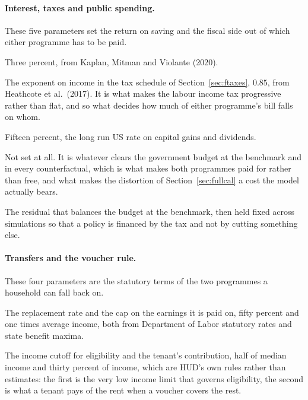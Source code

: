 \documentclass[10pt]{article}
\begin{document}
\paragraph{Interest, taxes and public spending.} These five parameters set the return on saving and the fiscal side out of which either programme has to be paid.
\begin{description}\setlength{\itemsep}{0.25em}\setlength{\parskip}{0em}
\item[$r$, the risk free rate.] Three percent, from Kaplan, Mitman and Violante
(2020).

\item[$\xi$, tax progressivity.] The exponent on income in the tax schedule of
Section~\ref{sec:ftaxes}, $0.85$, from Heathcote et al.\ (2017).
It is what makes the labour income tax progressive rather than
flat, and so what decides how much of either programme's bill falls on whom.

\item[$\tau_k$, the capital income tax.] Fifteen percent, the long run US rate on
capital gains and dividends.

\item[$\tau_{\ell}$, the level of the labour income tax.] Not set at all. It is
whatever clears the government budget at the benchmark and in every
counterfactual, which is what makes both programmes paid for rather than free, and
what makes the distortion of Section~\ref{sec:fullcal} a cost the model actually
bears.

\item[$G$, other public spending.] The residual that balances the budget at the
benchmark, then held fixed across simulations so that a policy is financed by the
tax and not by cutting something else.

\end{description}

\paragraph{Transfers and the voucher rule.} These four parameters are the statutory terms of the two programmes a household can fall back on.
\begin{description}\setlength{\itemsep}{0.25em}\setlength{\parskip}{0em}
\item[$\psi$ and $\bar y$, unemployment insurance.] The replacement rate and the
cap on the earnings it is paid on, fifty percent and one times average income, both
from Department of Labor statutory rates and state benefit maxima.

\item[$\kappa_V$ and $\kappa_r$, the voucher rules.] The income cutoff for
eligibility and the tenant's contribution, half of median income and thirty percent
of income, which are HUD's own rules rather than estimates: the first is the very low income limit that
governs eligibility, the second is what a tenant pays of the rent when a voucher
covers the rest.

\end{description}
\end{document}
